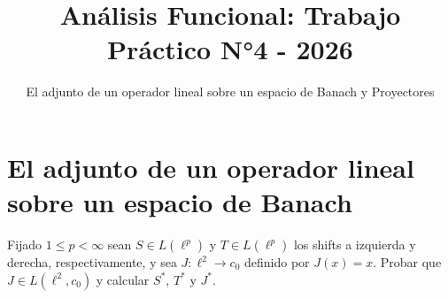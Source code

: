 \documentclass{article}
\theoremstyle{definition}
\newenvironment{ejercicio}[1]{\begin{trivlist}
\item[\hskip \labelsep {\bfseries Ejercicio}\hskip \labelsep {\bfseries #1.}]}{\end{trivlist}}
\begin{document}
\title{Análisis Funcional: Trabajo Práctico N°4 - 2026}
\author{El adjunto de un operador lineal sobre un espacio de Banach y Proyectores}
\date{}

\maketitle

\vspace{0.8cm}

\section{El adjunto de un operador lineal sobre un espacio de Banach}

\begin{ejercicio}{1}
	Fijado \( 1 \le p < \infty \) sean \( S \in L(\ell^p) \) y \( T \in L(\ell^p) \) los shifts a izquierda y derecha, respectivamente, y sea \( J: \ell^2 \to c_0 \) definido por \( J(x) = x \). Probar que \( J \in L(\ell^2, c_0) \) y calcular \( S^* \), \( T^* \) y \( J^* \).
\end{ejercicio}
\end{document}
